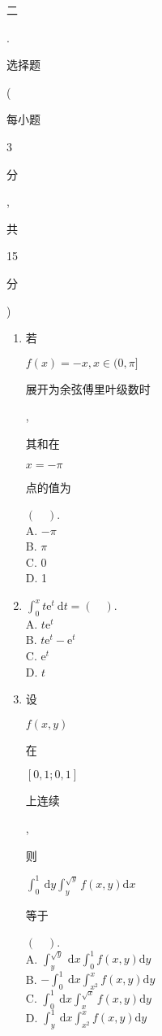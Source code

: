 \documentclass[10pt]{article}
\begin{document}
\begin{CJK}{UTF8}{mj}二\end{CJK}. \begin{CJK}{UTF8}{mj}选择题\end{CJK} (\begin{CJK}{UTF8}{mj}每小题\end{CJK} 3 \begin{CJK}{UTF8}{mj}分\end{CJK}, \begin{CJK}{UTF8}{mj}共\end{CJK} 15 \begin{CJK}{UTF8}{mj}分\end{CJK})

\begin{enumerate}
  \item \begin{CJK}{UTF8}{mj}若\end{CJK} $f(x)=-x, x \in(0, \pi]$ \begin{CJK}{UTF8}{mj}展开为余弦傅里叶级数时\end{CJK}, \begin{CJK}{UTF8}{mj}其和在\end{CJK} $x=-\pi$ \begin{CJK}{UTF8}{mj}点的值为\end{CJK} $(\quad)$.\\
A. $-\pi$\\
B. $\pi$\\
C. 0\\
D. 1

  \item $\int_{0}^{x} t \mathrm{e}^{t} \mathrm{~d} t=(\quad)$.\\
A. $t \mathrm{e}^{t}$\\
B. $t \mathrm{e}^{t}-\mathrm{e}^{t}$\\
C. $\mathrm{e}^{t}$\\
D. $t$

  \item \begin{CJK}{UTF8}{mj}设\end{CJK} $f(x, y)$ \begin{CJK}{UTF8}{mj}在\end{CJK} $[0,1 ; 0,1]$ \begin{CJK}{UTF8}{mj}上连续\end{CJK}, \begin{CJK}{UTF8}{mj}则\end{CJK} $\int_{0}^{1} \mathrm{~d} y \int_{y}^{\sqrt{y}} f(x, y) \mathrm{d} x$ \begin{CJK}{UTF8}{mj}等于\end{CJK} $(\quad)$.\\
A. $\int_{y}^{\sqrt{y}} \mathrm{~d} x \int_{0}^{1} f(x, y) \mathrm{d} y$\\
B. $-\int_{0}^{1} \mathrm{~d} x \int_{x^{2}}^{x} f(x, y) \mathrm{d} y$\\
C. $\int_{0}^{1} \mathrm{~d} x \int_{x}^{\sqrt{x}} f(x, y) \mathrm{d} y$\\
D. $\int_{y}^{1} \mathrm{~d} x \int_{x^{2}}^{x} f(x, y) \mathrm{d} y$


\end{enumerate}
\end{document}
